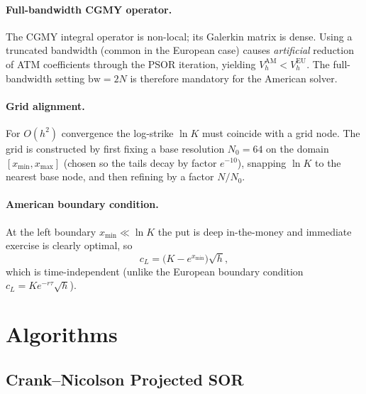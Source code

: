 \documentclass[11pt,a4paper]{article}
\begin{document}
\paragraph{Full-bandwidth CGMY operator.}
The CGMY integral operator is non-local; its Galerkin matrix is dense.
Using a truncated bandwidth (common in the European case) causes
\emph{artificial} reduction of ATM coefficients through the PSOR iteration,
yielding $V_h^{\mathrm{AM}} < V_h^{\mathrm{EU}}$.  The full-bandwidth setting
$\mathrm{bw} = 2N$ is therefore mandatory for the American solver.

\paragraph{Grid alignment.}
For $O(h^2)$ convergence the log-strike $\ln K$ must coincide with a grid
node.  The grid is constructed by first fixing a base resolution $N_0=64$ on
the domain $[x_{\min}, x_{\max}]$ (chosen so the tails decay by factor
$e^{-10}$), snapping $\ln K$ to the nearest base node, and then refining by a
factor $N/N_0$.

\paragraph{American boundary condition.}
At the left boundary $x_{\min}\ll\ln K$ the put is deep in-the-money and
immediate exercise is clearly optimal, so
\begin{equation}
  c_L = \bigl(K - e^{x_{\min}}\bigr)\sqrt{h},
\end{equation}
which is time-independent (unlike the European boundary condition
$c_L = Ke^{-r\tau}\sqrt{h}$).

\section{Algorithms}

\subsection{Crank--Nicolson Projected SOR}
\end{document}
